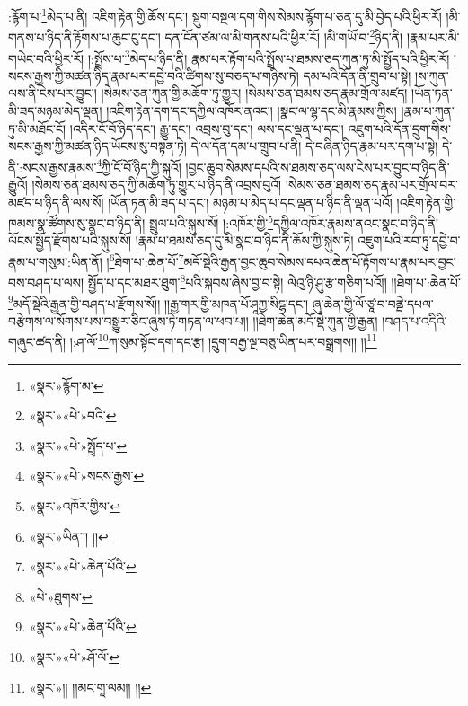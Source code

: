 :རྙོག་པ་\footnote{«སྣར་»རྙོག་མ་}མེད་པ་ནི། འཇིག་རྟེན་གྱི་ཆོས་དང་། སྡུག་བསྔལ་དག་གིས་སེམས་རྙོག་པ་ཅན་དུ་མི་བྱེད་པའི་ཕྱིར་རོ། །མི་གནས་པ་ཉིད་ནི་རྟོགས་པ་ཆུང་ངུ་དང་། དན་ངོན་ཙམ་ལ་མི་གནས་པའི་ཕྱིར་རོ། །མི་གཡོ་བ་\footnote{«སྣར་»«པེ་»བའི་}ཉིད་ནི། །རྣམ་པར་མི་གཡེང་བའི་ཕྱིར་རོ། །:སྤྲོས་པ་\footnote{«སྣར་»«པེ་»སྤྲོད་པ་}མེད་པ་ཉིད་ནི། རྣམ་པར་རྟོག་པའི་སྤྲོས་པ་ཐམས་ཅད་ཀུན་ཏུ་མི་སྤྱོད་པའི་ཕྱིར་རོ། །སངས་རྒྱས་ཀྱི་མཚན་ཉིད་རྣམ་པར་དབྱེ་བའི་ཚིགས་སུ་བཅད་པ་གཉིས་ཏེ། དམ་པའི་དོན་ནི་གྲུབ་པ་སྟེ། །ས་ཀུན་ལས་ནི་ངེས་པར་བྱུང་། །སེམས་ཅན་ཀུན་གྱི་མཆོག་ཏུ་གྱུར། །སེམས་ཅན་ཐམས་ཅད་རྣམ་གྲོལ་མཛད། །ཡོན་ཏན་མི་ཟད་མཉམ་མེད་ལྡན། །འཇིག་རྟེན་དག་དང་དཀྱིལ་འཁོར་ནའང་། །སྣང་ལ་ལྷ་དང་མི་རྣམས་ཀྱིས། །རྣམ་པ་ཀུན་ཏུ་མི་མཐོང་ངོ། །འདིར་ངོ་བོ་ཉིད་དང་། རྒྱུ་དང་། འབྲས་བུ་དང་། ལས་དང་ལྡན་པ་དང་། འཇུག་པའི་དོན་དྲུག་གིས་སངས་རྒྱས་ཀྱི་མཚན་ཉིད་ཡོངས་སུ་བསྟན་ཏེ། དེ་ལ་དོན་དམ་པ་གྲུབ་པ་ནི། དེ་བཞིན་ཉིད་རྣམ་པར་དག་པ་སྟེ། དེ་ནི་:སངས་རྒྱས་རྣམས་\footnote{«སྣར་»«པེ་»སངས་རྒྱས་}ཀྱི་ངོ་བོ་ཉིད་ཀྱི་སྐུའོ། །བྱང་ཆུབ་སེམས་དཔའི་ས་ཐམས་ཅད་ལས་ངེས་པར་བྱུང་བ་ཉིད་ནི་རྒྱུའོ། །སེམས་ཅན་ཐམས་ཅད་ཀྱི་མཆོག་ཏུ་གྱུར་པ་ཉིད་ནི་འབྲས་བུའོ། །སེམས་ཅན་ཐམས་ཅད་རྣམ་པར་གྲོལ་བར་མཛད་པ་ཉིད་ནི་ལས་སོ། །ཡོན་ཏན་མི་ཟད་པ་དང་། མཉམ་པ་མེད་པ་དང་ལྡན་པ་ཉིད་ནི་ལྡན་པའོ། །འཇིག་རྟེན་གྱི་ཁམས་སྣ་ཚོགས་སུ་སྣང་བ་ཉིད་ནི། སྤྲུལ་པའི་སྐུས་སོ། །:འཁོར་གྱི་\footnote{«སྣར་»འཁོར་གྱིས་}དཀྱིལ་འཁོར་རྣམས་ནའང་སྣང་བ་ཉིད་ནི། ལོངས་སྤྱོད་རྫོགས་པའི་སྐུས་སོ། །རྣམ་པ་ཐམས་ཅད་དུ་མི་སྣང་བ་ཉིད་ནི་ཆོས་ཀྱི་སྐུས་ཏེ། འཇུག་པའི་རབ་ཏུ་དབྱེ་བ་རྣམ་པ་གསུམ་:ཡིན་ནོ། །\footnote{«སྣར་»ཡིན་།། །།}ཐེག་པ་:ཆེན་པོ་\footnote{«སྣར་»«པེ་»ཆེན་པོའི་}མདོ་སྡེའི་རྒྱན་བྱང་ཆུབ་སེམས་དཔའ་ཆེན་པོ་རྟོགས་པ་རྣམ་པར་བྱང་བས་བཤད་པ་ལས། སྤྱོད་པ་དང་མཐར་ཐུག་\footnote{«པེ་»ཐུགས་}པའི་སྐབས་ཞེས་བྱ་བ་སྟེ། ལེའུ་ཉི་ཤུ་རྩ་གཅིག་པའོ།། །།ཐེག་པ་:ཆེན་པོ་\footnote{«སྣར་»«པེ་»ཆེན་པོའི་}མདོ་སྡེའི་རྒྱན་གྱི་བཤད་པ་རྫོགས་སོ།། །།རྒྱ་གར་གྱི་མཁན་པོ་ཤཱཀྱ་སིངྷ་དང་། ཞུ་ཆེན་གྱི་ལོ་ཙཱ་བ་བནྡེ་དཔལ་བརྩེགས་ལ་སོགས་པས་བསྒྱུར་ཅིང་ཞུས་ཏེ་གཏན་ལ་ཕབ་པ།། །།ཐེག་ཆེན་མདོ་སྡེ་ཀུན་གྱི་རྒྱན། །བཤད་པ་འདིའི་གཞུང་ཚད་ནི། །:ཤ་ལོ་\footnote{«སྣར་»«པེ་»ཤོ་ལོ་}ཀ་སུམ་སྟོང་དག་དང་རྩ། །དྲུག་བརྒྱ་ལྔ་བཅུ་ཡིན་པར་བསྒྲགས།། །།\footnote{«སྣར་»།། །།མང་གཱ་ལམ།། །།}
